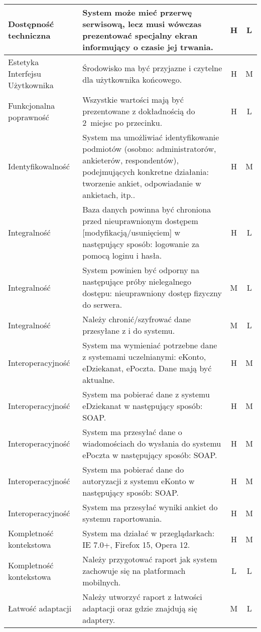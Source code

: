 \begin{center}
\begin{longtable}{ | p{4cm} | p{9cm} | c | c | }
%
Dostępność techniczna & System może mieć przerwę serwisową, lecz musi wówczas prezentować specjalny ekran informujący o czasie jej trwania. & H & L \\ \hline
%
Estetyka Interfejsu Użytkownika & Środowisko ma być przyjazne i czytelne dla użytkownika końcowego. & H & M \\ \hline
%
Funkcjonalna poprawność & Wszystkie wartości mają być prezentowane z dokładnością do 2~miejsc po przecinku. & H & L \\ \hline
%
Identyfikowalność & System ma umożliwiać identyfikowanie podmiotów (osobno: administratorów, ankieterów, respondentów), podejmujących konkretne działania: tworzenie ankiet, odpowiadanie w 
ankietach, itp.. & H & M \\ \hline
%
Integralność & Baza danych powinna być chroniona przed nieuprawnionym dostępem [modyfikacją\slash usunięciem] w następujący sposób: logowanie za pomocą loginu i hasła. & H & L \\ \hline
Integralność & System powinien być odporny na następujące próby nielegalnego dostępu: nieuprawniony dostęp fizyczny do serwera. & M & L \\ \hline
Integralność & Należy chronić\slash szyfrować dane przesyłane z i do systemu. & M & L \\ \hline
%
Interoperacyjność & System ma wymieniać potrzebne dane z systemami uczelnianymi: eKonto, eDziekanat, ePoczta. Dane mają być aktualne. & H & M \\ \hline
Interoperacyjność & System ma pobierać dane z systemu eDziekanat w następujący sposób: SOAP. & H & M \\ \hline
Interoperacyjność & System ma przesyłać dane o wiadomościach do wysłania do systemu ePoczta w następujący sposób: SOAP. & H & M \\ \hline
Interoperacyjność & System ma pobierać dane do autoryzacji z systemu eKonto w następujący sposób: SOAP. & H & M \\ \hline
Interoperacyjność & System ma przesyłać wyniki ankiet do systemu raportowania. & H & M \\ \hline
%
Kompletność kontekstowa & System ma działać w przeglądarkach: IE 7.0+, Firefox 15, Opera 12. & H & M \\ \hline
Kompletność kontekstowa & Należy przygotować raport jak system zachowuje się na platformach mobilnych. & L & L \\ \hline
%
Łatwość adaptacji & Należy utworzyć raport z łatwości adaptacji oraz gdzie znajdują się adaptery. & M & L \\ \hline

\end{longtable}
\end{center}
